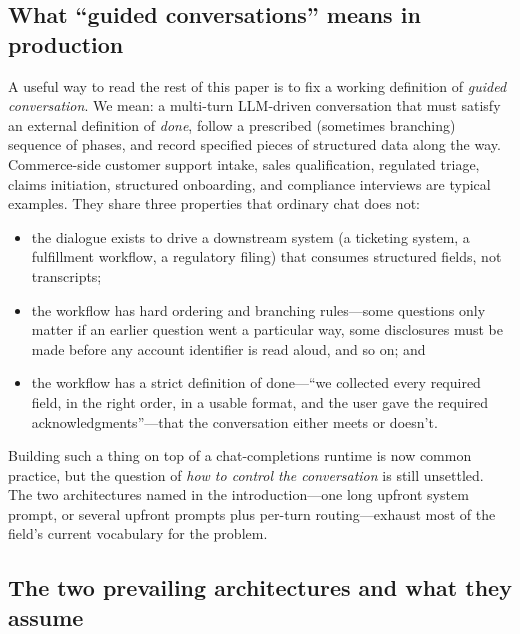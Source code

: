 \documentclass[11pt,a4paper]{article}
\begin{document}
\subsection{What ``guided conversations'' means in production}

A useful way to read the rest of this paper is to fix a working definition of \emph{guided conversation}. We mean: a multi-turn LLM-driven conversation that must satisfy an external definition of \emph{done}, follow a prescribed (sometimes branching) sequence of phases, and record specified pieces of structured data along the way. Commerce-side customer support intake, sales qualification, regulated triage, claims initiation, structured onboarding, and compliance interviews are typical examples. They share three properties that ordinary chat does not:

\begin{itemize}[noitemsep]
    \item the dialogue exists to drive a downstream system (a ticketing system, a fulfillment workflow, a regulatory filing) that consumes structured fields, not transcripts;
    \item the workflow has hard ordering and branching rules---some questions only matter if an earlier question went a particular way, some disclosures must be made before any account identifier is read aloud, and so on; and
    \item the workflow has a strict definition of done---``we collected every required field, in the right order, in a usable format, and the user gave the required acknowledgments''---that the conversation either meets or doesn't.
\end{itemize}

Building such a thing on top of a chat-completions runtime is now common practice, but the question of \emph{how to control the conversation} is still unsettled. The two architectures named in the introduction---one long upfront system prompt, or several upfront prompts plus per-turn routing---exhaust most of the field's current vocabulary for the problem.

\subsection{The two prevailing architectures and what they assume}
\end{document}
